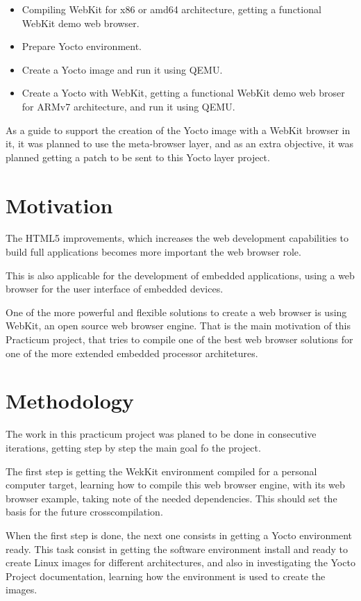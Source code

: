 \documentclass[a4paper,11pt,openany]{report}
\begin{document}
\begin{itemize}
\item Compiling WebKit for x86 or amd64 architecture, getting a functional WebKit demo web browser.
\item Prepare Yocto environment.
\item Create a Yocto image and run it using QEMU.
\item Create a Yocto with WebKit, getting a functional WebKit demo web broser for ARMv7 architecture, and run it using QEMU.
\end{itemize}

As a guide to support the creation of the Yocto image with a WebKit browser in it, it was planned to use the meta-browser\cite{meta-browser} layer, and as an extra objective, it was planned getting a patch to be sent to this Yocto layer project.

\section{Motivation}
The HTML5 improvements, which increases the web development capabilities to build full applications becomes more important the web browser role.

This is also applicable for the development of embedded applications, using a web browser for the user interface of embedded devices.

One of the more powerful and flexible solutions to create a web browser is using WebKit, an open source web browser engine. That is the main motivation of this Practicum project, that tries to compile one of the best web browser solutions for one of the more extended embedded processor architetures.

\section{Methodology}
The work in this practicum project was planed to be done in consecutive iterations, getting step by step the main goal fo the project.

The first step is getting the WekKit environment compiled for a personal computer target, learning how to compile this web browser engine, with its web browser example, taking note of the needed dependencies. This should set the basis for the future crosscompilation.

When the first step is done, the next one consists in getting a Yocto environment ready. This task consist in getting the software environment install and ready to create Linux images for different architectures, and also in investigating the Yocto Project documentation, learning how the environment is used to create the images.
\end{document}
